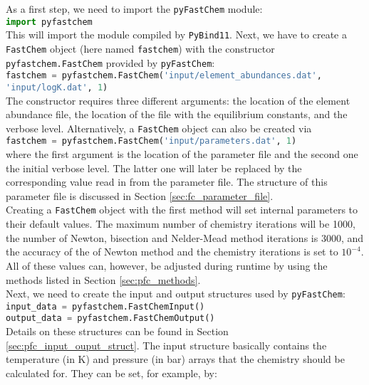 \documentclass[numbers=noenddot]{fcmanual}
\newcommand{\fc}{\texttt{FastChem}\xspace}
\newcommand{\pfc}{\texttt{pyFastChem}\xspace}
\newcommand{\pb}{\texttt{PyBind11}\xspace}
\begin{document}
As a first step, we need to import the \pfc module:\\

\lstinline[language=Python]!import pyfastchem!\\

This will import the module compiled by \pb. Next, we have to create a \fc object (here named \lstinline[language=Python]!fastchem!) with the constructor \lstinline[language=Python]!pyfastchem.FastChem! provided by \pfc:\\

\lstinline[language=Python]!fastchem = pyfastchem.FastChem('input/element_abundances.dat', 'input/logK.dat', 1)!\\

The constructor requires three different arguments: the location of the element abundance file, the location of the file with the equilibrium constants, and the verbose level. Alternatively, a \fc object can also be created via\\

\lstinline[language=Python]!fastchem = pyfastchem.FastChem('input/parameters.dat', 1)!\\

where the first argument is the location of the parameter file and the second one the initial verbose level. The latter one will later be replaced by the corresponding value read in from the parameter file. The structure of this parameter file is discussed in Section \ref{sec:fc_parameter_file}.\\

Creating a \fc object with the first method will set internal parameters to their default values. The maximum number of chemistry iterations will be 1000, the number of Newton, bisection and Nelder-Mead method iterations is 3000, and the accuracy of the of Newton method and the chemistry iterations is set to $10^{-4}$. All of these values can, however, be adjusted during runtime by using the methods listed in Section \ref{sec:pfc_methods}.\\

Next, we need to create the input and output structures used by \pfc:\\

\lstinline[language=Python]!input_data = pyfastchem.FastChemInput()!\\
\lstinline[language=Python]!output_data = pyfastchem.FastChemOutput()!\\

Details on these structures can be found in Section \ref{sec:pfc_input_ouput_struct}. The input structure basically contains the temperature (in K) and pressure (in bar) arrays that the chemistry should be calculated for. They can be set, for example, by:\\
\end{document}
